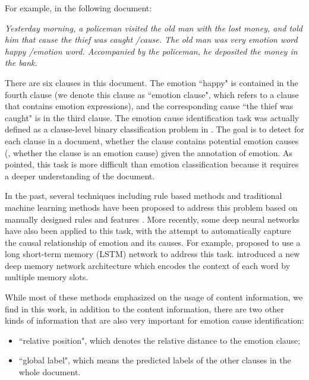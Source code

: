 \documentclass[letterpaper]{article} \usepackage{aaai19}  \usepackage{times}  \usepackage{helvet}  \usepackage{courier}  \usepackage{url}  \usepackage{graphicx}  \frenchspacing  \setlength{\pdfpagewidth}{8.5in}  \setlength{\pdfpageheight}{11in}  \setcounter{secnumdepth}{0}
\begin{document}
For example, in the following document:

\noindent \textit{Yesterday morning, a policeman visited the old man with the lost money, and told him that cause the thief was caught /cause. The old man was very emotion word happy /emotion word. Accompanied by the policeman, he deposited the money in the bank.}

\noindent  There are six clauses in this document. The emotion ``happy" is contained in the fourth clause (we denote this clause as ``emotion clause", which refers to a clause that contains emotion expressions), and the corresponding cause ``the thief was caught" is in the third clause. The emotion cause identification task was actually defined as a clause-level binary classification problem in \cite{gui2016event,gui2017question}. The goal is to detect for each clause in a document, whether the clause contains potential emotion causes (, whether the clause is an emotion cause) given the annotation of emotion. As \cite{gui2016event} pointed, this task is more difficult than emotion classification because it requires a deeper understanding of the document.



In the past, several techniques including rule based methods and traditional machine learning methods have been proposed to address this problem based on manually designed rules and features \cite{lee2010text,lee2013detecting,chen2010emotion,gui2016event}. More recently, some deep neural networks have also been applied to this task, with the attempt to automatically capture the causal relationship of emotion and its causes. For example, \cite{cheng2017emotion} proposed to use a long short-term memory (LSTM) network to address this task. \cite{gui2017question} introduced a new deep memory network architecture which encodes the context of each word by multiple memory slots.

While most of these methods emphasized on the usage of content information, we find in this work, in addition to the content information, there are two other kinds of information that are also very important for emotion cause identification:
\begin{itemize}
	\item ``relative position", which denotes the relative distance to the emotion clause;
	\item ``global label", which means the predicted labels of the other clauses in the whole document.
\end{itemize}
\end{document}
